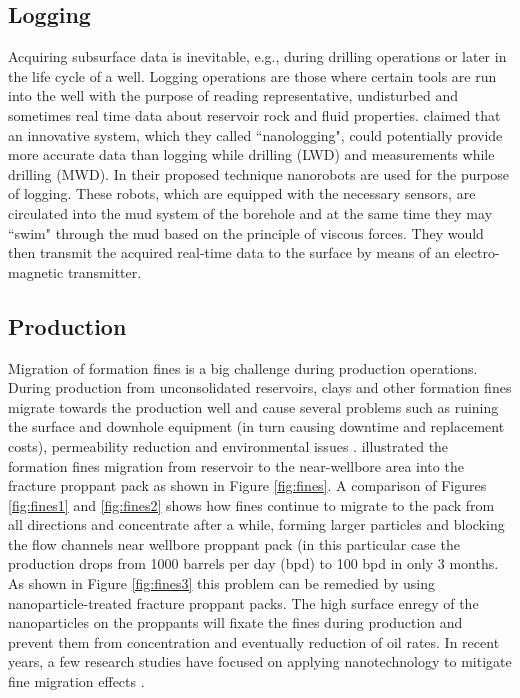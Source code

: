 \subsection{Logging}
Acquiring subsurface data is inevitable, e.g., during drilling operations or later in the life cycle of a well. Logging operations are those where certain tools are run into the well with the purpose of reading representative, undisturbed and sometimes real time data about reservoir rock and fluid properties. \citet{Singh2006} claimed that an innovative system, which they called ``nanologging", could potentially provide more accurate data than logging while drilling (LWD) and measurements while drilling (MWD). In their proposed technique nanorobots are used for the purpose of logging. These robots, which are equipped with the necessary sensors, are circulated into the mud system of the borehole and at the same time they may ``swim" through the mud based on the principle of viscous forces. They would then transmit the acquired real-time data to the surface by means of an electro-magnetic transmitter. 

\subsection{Production}
Migration of formation fines is a big challenge during production operations. During production from unconsolidated reservoirs, clays and other formation fines migrate towards the production well and cause several problems such as ruining the surface and downhole equipment (in turn causing downtime and replacement costs), permeability reduction and environmental issues \citep{Tiffin1998}. \citet{Huang2008} illustrated the formation fines migration from reservoir to the near-wellbore area into the fracture proppant pack as shown in Figure \ref{fig:fines}. A comparison of Figures \ref{fig:fines1} and \ref{fig:fines2} shows how fines continue to migrate to the pack from all directions and concentrate after a while, forming larger particles and blocking the flow channels near wellbore proppant pack (in this particular case the production drops from 1000 barrels per day (bpd) to 100 bpd in only 3 months. As shown in Figure \ref{fig:fines3} this problem can be remedied by using nanoparticle-treated fracture proppant packs. The high surface enregy of the nanoparticles on the proppants will fixate the fines during production and prevent them from concentration and eventually reduction of oil rates. In recent years, a few research studies have focused on applying nanotechnology to mitigate fine migration effects \citep{Belcher2010,Habibi2011,Ogolo2012,Ahmadi2013}.

